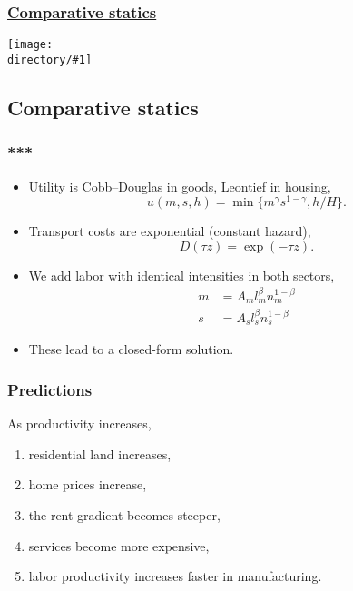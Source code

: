 \documentclass[handout,compress,mathserif]{beamer}
\newcommand{\directory}{figures}
\newcommand{\widefigure}[2]{\begin{frame}\frametitle{\hyperlink{#1back}{#2}}\hypertarget{#1}{{\begin{center}\texttt{[image: \\directory/\#1]}\end{center}}}\end{frame}}
\begin{document}
\widefigure{bid-rent-3-prime}{Comparative statics}

\subsection{Comparative statics}

\begin{frame}\frametitle{***}
\begin{itemize}
    \item Utility is Cobb--Douglas in goods, Leontief in housing,
\[
u(m,s,h) = \min\{m^\gamma s^{1-\gamma} ,h/H\}.
\]
    \item Transport costs are exponential (constant hazard),
\[
D(\tau z) = \exp(-\tau z).
\]
	\item We add labor with identical intensities in both sectors,
\begin{align*}
m&=A_ml_m^\beta n_m^{1-\beta}\\
s&=A_sl_s^\beta n_s^{1-\beta}
\end{align*}
	\item These lead to a closed-form solution.

\end{itemize}
\end{frame}



\begin{frame}\frametitle{Predictions}


As productivity increases,
\begin{enumerate}
    \item residential land increases,
    \item home prices increase,
    \item the rent gradient becomes steeper,
    \item services become more expensive,
	\item labor productivity increases faster in manufacturing.
\end{enumerate}

\end{frame}


\end{document}
